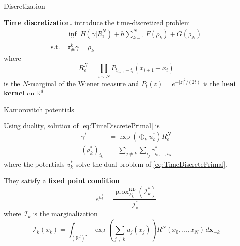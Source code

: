 \documentclass[xcolor={dvipsnames}]{beamer}
\newcommand{\RR}{\mathbb{R}}
\newcommand{\calI}{\mathcal{I}}
\newcommand{\suchthat}{\text{s.t.}}
\renewcommand{\epsilon}{\varepsilon}
\DeclareMathOperator{\KL}{KL}
\DeclareMathOperator{\prox}{prox}
\begin{document}
\begin{frame}{Discretization}
	
	\textbf{Time discretization.} \citeauthor{benamou2018entropy} introduce the time-discretized problem
	\begin{subequations}\label{eq:TimeDiscretePrimal}
	\begin{align}
		&\inf_\gamma~
		H(\gamma | R^N_\epsilon) +
		h \sum_{k=1}^{N} F(\rho_k) +
		G(\rho_N)  \\
		\suchthat\ & \pi^k_\#\gamma = \rho_k
	\end{align}
	\end{subequations}
	where
	\[
		R^N_\epsilon = \prod_{i<N} P_{t_{i+1}-t_i}(x_{i+1}-x_i)
	\]
	is the $N$-marginal of the Wiener measure and $P_t(z) = e^{-|z|^2/(2t)}$ is the \textbf{heat kernel} on $\RR^d$.
	
\end{frame}

\begin{frame}[allowframebreaks]{Kantorovitch potentials}
	
	Using duality, solution of \eqref{eq:TimeDiscretePrimal} is
	\begin{align*}
		\gamma^* &= \exp(\oplus_k u^*_k) R^N_\epsilon  \\
		(\rho_k^*)_{i_k} &= \sum_{j\neq k}\sum_{i_j} \gamma^*_{i_0,\ldots,i_N}
	\end{align*}
	where the potentials $u^*_k$ solve the dual problem of \eqref{eq:TimeDiscretePrimal}.
	
	\framebreak
	
	They satisfy a \textbf{fixed point condition}
	\begin{equation}
		e^{u^*_k} = \frac{
			\prox^{\KL}_{F_k}(\calI_k^*)
		}{
			\calI_k^*
		}
	\end{equation}
	where $\calI_k$ is the marginalization
	\begin{equation*}
		\calI_k(x_k) = \int_{(\RR^d)^N}
		\exp\left(\sum_{j\neq k} u_j(x_j) \right) R^N(x_0,\ldots,x_N)\, d\boldsymbol{x}_{-k}
	\end{equation*}
	
	
	
\end{frame}
\end{document}

